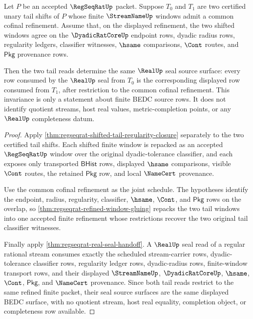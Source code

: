 \begin{theorem}
\label{thm:regseqrat-tail-cofinal-real-seal-invariance}
Let $P$ be an accepted $\RegSeqRatUp$ packet. Suppose $T_0$ and $T_1$ are two certified unary tail shifts of $P$ whose finite $\StreamNameUp$ windows admit a common cofinal refinement. Assume that, on the displayed refinement, the two shifted windows agree on the $\DyadicRatCoreUp$ endpoint rows, dyadic radius rows, regularity ledgers, classifier witnesses, $\hsame$ comparisons, $\Cont$ routes, and $\mathsf{Pkg}$ provenance rows.

Then the two tail reads determine the same $\RealUp$ seal source surface: every row consumed by the $\RealUp$ seal from $T_0$ is the corresponding displayed row consumed from $T_1$, after restriction to the common cofinal refinement. This invariance is only a statement about finite BEDC source rows. It does not identify quotient streams, host real values, metric-completion points, or any $\RealUp$ completeness datum.
\end{theorem}
\begin{proof}
Apply \autoref{thm:regseqrat-shifted-tail-regularity-closure} separately to the two certified tail shifts. Each shifted finite window is repacked as an accepted $\RegSeqRatUp$ window over the original dyadic-tolerance classifier, and each exposes only transported $\mathsf{BHist}$ rows, displayed $\hsame$ comparisons, visible $\Cont$ routes, the retained $\mathsf{Pkg}$ row, and local $\NameCert$ provenance.

Use the common cofinal refinement as the joint schedule. The hypotheses identify the endpoint, radius, regularity, classifier, $\hsame$, $\Cont$, and $\mathsf{Pkg}$ rows on the overlap, so \autoref{thm:regseqrat-refined-window-gluing} repacks the two tail windows into one accepted finite refinement whose restrictions recover the two original tail classifier witnesses.

Finally apply \autoref{thm:regseqrat-real-seal-handoff}. A $\RealUp$ seal read of a regular rational stream consumes exactly the scheduled stream-carrier rows, dyadic-tolerance classifier rows, regularity ledger rows, dyadic-radius rows, finite-window transport rows, and their displayed $\StreamNameUp$, $\DyadicRatCoreUp$, $\hsame$, $\Cont$, $\mathsf{Pkg}$, and $\NameCert$ provenance. Since both tail reads restrict to the same refined finite packet, their seal source surfaces are the same displayed BEDC surface, with no quotient stream, host real equality, completion object, or completeness row available.
\end{proof}

